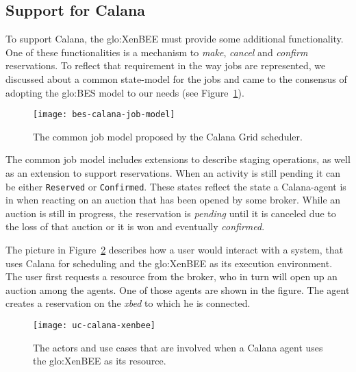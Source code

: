 \subsection{Support for Calana}
\label{sec:calana-support}

To  support  Calana, the  \gls{glo:XenBEE}  must  provide some  additional
functionality. One of these functionalities is a mechanism to \emph{make},
\emph{cancel}   and   \emph{confirm}   reservations.   To   reflect   that
requirement in the  way jobs are represented, we  discussed about a common
state-model  for  the jobs  and  came to  the  consensus  of adopting  the
\gls{glo:BES}         model        to        our         needs        (see
Figure~\ref{fig:bes-calana-job-model}).

\begin{figure}[h]
  \centering
  \texttt{[image: bes-calana-job-model]}
  \caption[Calana Job Model]{The common job model proposed by the Calana
    Grid scheduler.}
  \label{fig:bes-calana-job-model}
\end{figure}

The common  job model includes extensions to  describe staging operations,
as well as an extension to support reservations. When an activity is still
pending it  can be  either \texttt{Reserved} or  \texttt{Confirmed}. These
states reflect the state a Calana-agent  is in when reacting on an auction
that  has  been opened  by  some  broker. While  an  auction  is still  in
progress, the  reservation is \emph{pending}  until it is canceled  due to
the loss of  that auction or it is won  and eventually \emph{confirmed}.


The picture  in Figure~\ref{fig:calana-xenbee} describes how  a user would
interact  with  a  system,  that   uses  Calana  for  scheduling  and  the
\gls{glo:XenBEE} as  its execution environment. The user  first requests a
resource from  the broker, who in turn  will open up an  auction among the
agents.  One of those agents are  shown in the figure. The agent creates a
reservation on the \emph{xbed} to which he is connected.

\begin{figure}[htbp]
  \centering
  \texttt{[image: uc-calana-xenbee]}
  \caption[Calana and  XenBEE]{The actors and use cases  that are involved
    when a Calana agent uses the \gls{glo:XenBEE} as its resource.}
  \label{fig:calana-xenbee}
\end{figure}

